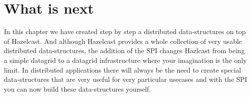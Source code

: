 \section{What is next}
In this chapter we have created step by step a distributed data-structures on top of Hazelcast. And although Hazelcast provides a whole collection of very usable distributed data-structures, the addition of the SPI changes Hazlcast from being a simple datagrid to a datagrid infrastructure where your imagination is the only limit. In distributed applications there will always be the need to create special data-structures that are very useful for very particular usecases and with the SPI you can now build these data-structures yourself.